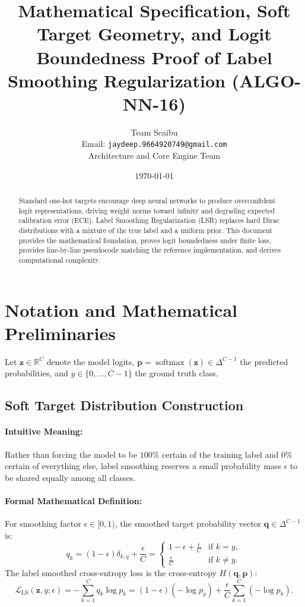\documentclass[11pt]{article}
\title{\textbf{Mathematical Specification, Soft Target Geometry, and Logit Boundedness Proof of Label Smoothing Regularization (ALGO-NN-16)}}
\author{Team Scaibu \\ \small Email: \texttt{jaydeep.9664920749@gmail.com} \\ \small Architecture and Core Engine Team}
\date{\today}
\begin{document}
\maketitle

\begin{abstract}
Standard one-hot targets encourage deep neural networks to produce overconfident logit representations, driving weight norms toward infinity and degrading expected calibration error (ECE). Label Smoothing Regularization (LSR) replaces hard Dirac distributions with a mixture of the true label and a uniform prior. This document provides the mathematical foundation, proves logit boundedness under finite loss, provides line-by-line pseudocode matching the reference implementation, and derives computational complexity.
\end{abstract}

\section{Notation and Mathematical Preliminaries}
\label{sec:notation}

Let $\mathbf{z} \in \mathbb{R}^C$ denote the model logits, $\mathbf{p} = \operatorname{softmax}(\mathbf{z}) \in \Delta^{C-1}$ the predicted probabilities, and $y \in \{0, \dots, C-1\}$ the ground truth class.

\subsection{Soft Target Distribution Construction}
\paragraph{Intuitive Meaning:} Rather than forcing the model to be $100\%$ certain of the training label and $0\%$ certain of everything else, label smoothing reserves a small probability mass $\epsilon$ to be shared equally among all classes.

\paragraph{Formal Mathematical Definition:}
For smoothing factor $\epsilon \in [0, 1)$, the smoothed target probability vector $\mathbf{q} \in \Delta^{C-1}$ is:
\begin{equation}
\label{eq:smooth_target}
q_k = (1 - \epsilon)\delta_{k, y} + \frac{\epsilon}{C} = \begin{cases} 1 - \epsilon + \frac{\epsilon}{C} & \text{if } k = y, \\ \frac{\epsilon}{C} & \text{if } k \neq y. \end{cases}
\end{equation}
The label smoothed cross-entropy loss is the cross-entropy $H(\mathbf{q}, \mathbf{p})$:
\begin{equation}
\label{eq:smooth_loss}
\mathcal{L}_{\mathrm{LS}}(\mathbf{z}, y; \epsilon) = -\sum_{k=1}^C q_k \log p_k = (1 - \epsilon)(-\log p_y) + \frac{\epsilon}{C} \sum_{k=1}^C (-\log p_k).
\end{equation}
\end{document}
